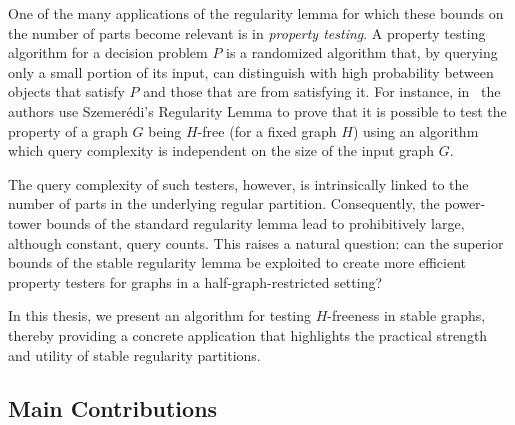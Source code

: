     One of the many applications of the regularity lemma for which these bounds on the number of parts become relevant is in
    \emph{property testing}.
    A property testing algorithm for a decision problem $P$ is a randomized algorithm that, by querying only a small portion
    of its input, can distinguish with high probability between objects that satisfy $P$ and those that are  from
    satisfying it.
    For instance, in~\cite{efficient_testing_of_large_graphs} the authors use Szemer\'edi's Regularity Lemma
    to prove that it is possible to test the property of a graph $G$ being $H$-free (for a fixed graph $H$) using an algorithm
    which query complexity is independent on the size of the input graph $G$.

    The query complexity of such testers, however, is intrinsically linked to the number of parts in the underlying regular
    partition.
    Consequently, the power-tower bounds of the standard regularity lemma lead to prohibitively large, although constant,
    query counts.
    This raises a natural question: can the superior bounds of the stable regularity lemma be exploited to create more
    efficient property testers for graphs in a half-graph-restricted setting?

    In this thesis, we present an algorithm for testing $H$-freeness in stable graphs, thereby providing
    a concrete application that highlights the practical strength and utility of stable regularity partitions.

    \subsection{Main Contributions} \label{subsec:main_contributions}

